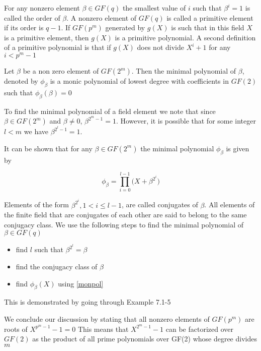 \documentclass[fontsize=12pt]{article}
\begin{document}
 For any nonzero element $\beta \in GF(q)$ the smallest value of $i$ such that $\beta^i=1$ is called the order of $\beta$.
 A nonzero element of $GF(q)$ is called a primitive element if its order is $q-1$.
 If $GF(p^m)$ generated by $g(X)$ is such that in this field $X$ is a primitive element, then $g(X)$ is a primitive polynomial. A second definition of a primitive polynomial is that if $g(X)$ does not divide $X^i+1$ for any $i<p^m-1$
 
 Let $\beta$ be a non zero element of $GF(2^m)$. Then the minimal polynomial of $\beta$, denoted by $\phi_{\beta}$ is a monic polynomial of lowest degree with coefficients in $GF(2)$ such that $\phi_{\beta}(\beta)=0$
 
 
 To find the minimal polynomial of a field element we note that since $\beta \in GF(2^m)$ and $\beta \neq 0$, $\beta^{{2^m}-1}=1$. However, it is possible that for some integer $l <  m$ we have $\beta^{{2^l}-1}=1$. 
 
 It can be shown that for any $\beta \in GF(2^m)$ the minimal polynomial $\phi_{\beta}$ is given by 
 
 \begin{equation}
 \phi_{\beta} = \prod_{i=0}^{l-1} \Big(X+\beta^{{2^i}}\Big)
 \label{monpol}
 \end{equation}
 
 Elements of the form $\beta^{{2^i}}, 1 < i \leq l-1$, are called conjugates of $\beta$.
 All elements of the finite field that are conjugates of each  other are said to belong to the same conjugacy class. 
  \newpage
  We use the following steps to find the minimal polynomial of $\beta \in GF(q)$

 \begin{itemize}
 \item find $l$ such that $\beta^{{2^l}}=\beta$
 
 \item find the conjugacy class of $\beta$
 
 \item find  $\phi_{\beta}(X)$ using \ref{monpol}
 \end{itemize}
 
 This is demonstrated by going through Example 7.1-5
 
 We conclude our discussion by stating that all nonzero elements of $GF(p^m)$ are roots of $X^{{p^m}-1}-1=0$ This means that  $X^{{2^m}-1}-1$ can be factorized over $GF(2)$ as the product of all prime polynomials over GF(2) whose degree divides $m$
 
\end{document}
